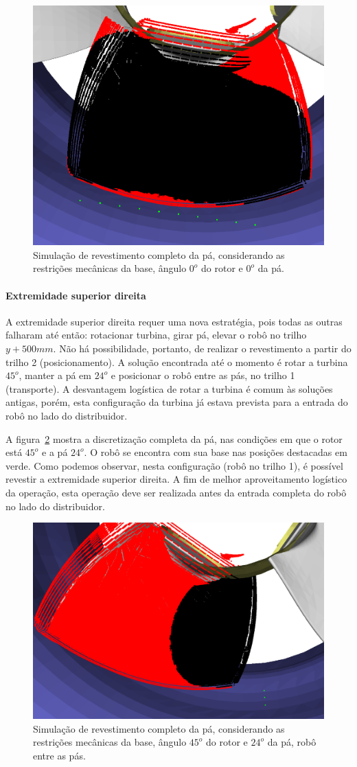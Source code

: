 \begin{figure}[!ht]
	\centering	
	\includegraphics[width=.5\columnwidth]{figs/simcomp1_4.png}
	\caption{Simulação de revestimento completo da pá, considerando as
	restrições mecânicas da base, ângulo $0^o$ do rotor e $0^o$ da pá.}
	\label{fig::simcomp1_4}
\end{figure}

\paragraph{Extremidade superior direita}
A extremidade superior direita requer uma nova estratégia, pois todas as
outras falharam até então: rotacionar turbina, girar pá, elevar o robô no trilho
$y+500 mm$. Não há possibilidade, portanto, de realizar o revestimento a partir
do trilho 2 (posicionamento). A solução encontrada até o momento é rotar a
turbina $45^o$, manter a pá em $24^o$ e posicionar o robô entre as pás, no
trilho 1 (transporte). A desvantagem logística de rotar a turbina é comum às
soluções antigas, porém, esta configuração da turbina já estava prevista para
a entrada do robô no lado do distribuidor.

A figura~\ref{fig::simcomp1_7} mostra a discretização completa da pá, nas
condições em que o rotor está $45^o$ e a pá $24^o$. O robô se encontra
com sua base nas posições destacadas em verde. Como podemos observar, nesta
configuração (robô no trilho 1), é possível revestir a extremidade
superior direita. A fim de melhor aproveitamento logístico da
operação, esta operação deve ser realizada antes da entrada completa
do robô no lado do distribuidor.

\begin{figure}[!ht]
	\centering	
	\includegraphics[width=.5\columnwidth]{figs/simcomp1_7.png}
	\caption{Simulação de revestimento completo da pá, considerando as
	restrições mecânicas da base, ângulo $45^o$ do rotor e $24^o$ da pá, robô
	entre as pás.}
	\label{fig::simcomp1_7}
\end{figure}

